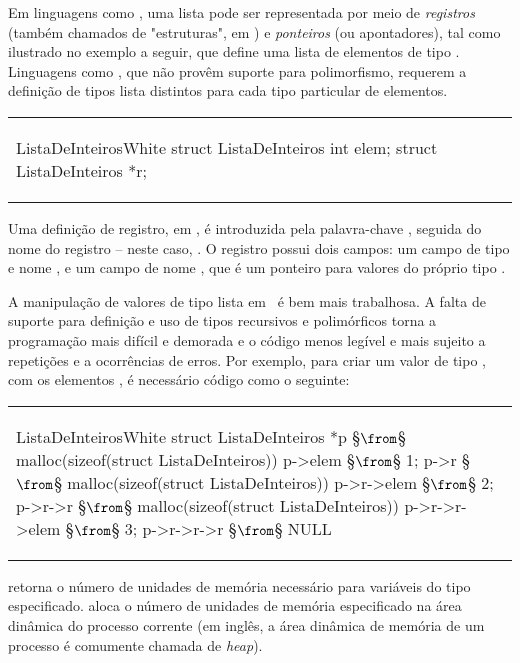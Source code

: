 Em linguagens como \C, uma lista pode ser representada por meio de
{\em registros} (também chamados de "estruturas", em \C) e {\em
  ponteiros\/} (ou apontadores), tal como ilustrado no exemplo a
seguir, que define uma lista de elementos de tipo
. Linguagens como \C, que não provêm suporte para
polimorfismo, requerem a definição de tipos lista distintos para cada
tipo particular de elementos.

\begin{center}
\begin{tabular}{l}
\begin{alg}{ListaDeInteiros}{White}
struct ListaDeInteiros
   int elem; 
   struct ListaDeInteiros *r;
\end{alg}
\end{tabular}
\end{center}

Uma definição de registro, em \C, é introduzida pela palavra-chave
, seguida do nome do registro -- neste caso,
. O registro possui dois campos: um campo de tipo
 e nome , e um campo de nome , que é um
ponteiro para valores do próprio tipo .
 
A manipulação de valores de tipo lista em \C\ é bem mais trabalhosa. A
falta de suporte para definição e uso de tipos recursivos e
polimórficos torna a programação mais difícil e demorada e o código
menos legível e mais sujeito a repetições e a ocorrências de
erros. Por exemplo, para criar um valor de tipo ,
com os elementos , é necessário código como o seguinte:

\begin{center}
\begin{tabular}{l}
\begin{alg}{ListaDeInteiros}{White}
struct ListaDeInteiros *p §$\from$§ malloc(sizeof(struct ListaDeInteiros))
   p->elem §$\from$§ 1;       p->r §$\from$§ malloc(sizeof(struct ListaDeInteiros))
   p->r->elem §$\from$§ 2;    p->r->r §$\from$§ malloc(sizeof(struct ListaDeInteiros))
   p->r->r->elem §$\from$§ 3; p->r->r->r §$\from$§ NULL
\end{alg}
\end{tabular}
\end{center}

 retorna o número de unidades de memória necessário para
variáveis do tipo especificado.  aloca o número de
unidades de memória especificado na área dinâmica do processo corrente
(em inglês, a área dinâmica de memória de um processo é comumente
chamada de {\em heap\/}).

